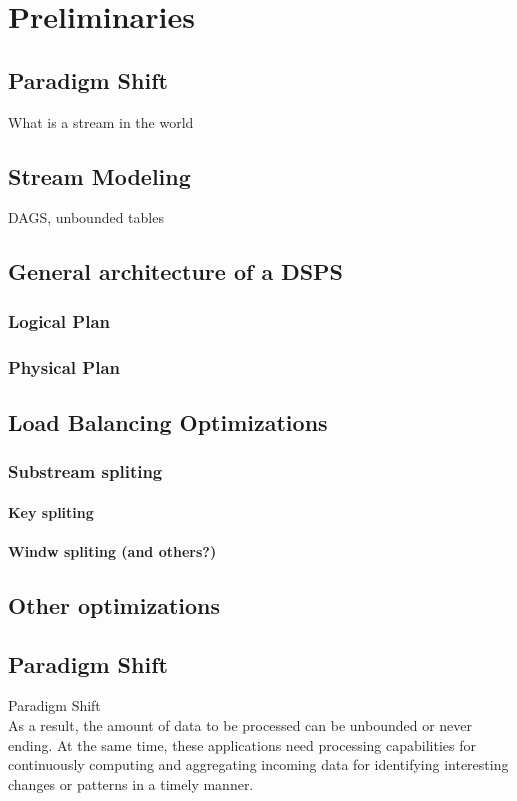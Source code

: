 \chapter{Preliminaries
  \label{chapter:preliminaries}}


\section{Paradigm Shift}
What is a stream in the world
\section{Stream Modeling}
DAGS, unbounded tables
\section{General architecture of a DSPS}
\subsection{Logical Plan}
\subsection{Physical Plan}
\section{Load Balancing Optimizations}
\subsection{Substream spliting}
\subsubsection{Key spliting}
\subsubsection{Windw spliting (and others?)}
\section{Other optimizations}


\section{Paradigm Shift}
Paradigm Shift\cite{chakravarthy2009stream}\\ As a result, the amount of data to be
processed can be unbounded or never ending. At the same time, these applications
need processing capabilities for continuously computing and aggregating incoming
data for identifying interesting changes or patterns in a timely manner.

